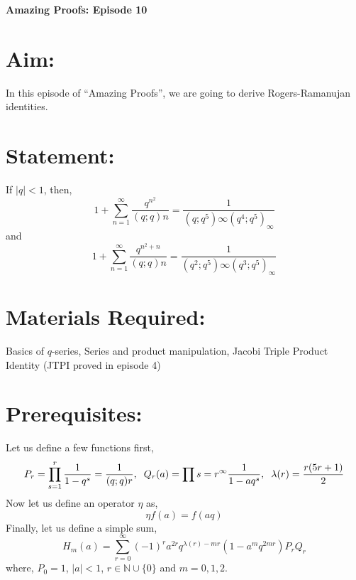 \documentclass[12pt]{article}
\begin{document}
\begin{center}\Large \bf{Amazing Proofs: Episode 10 }\end{center}

\section*{Aim:}
In this episode of \enquote{Amazing Proofs}, we are going to derive Rogers-Ramanujan identities.

\section*{Statement:}
If $|q|<1$, then,
$$1+\sum_{n=1}^{\infty}\frac{q^{n^2}}{(q;q)n}=\frac{1}{(q;q^5){\infty}(q^4;q^5)_{\infty}}$$
and 
$$1+\sum_{n=1}^{\infty}\frac{q^{n^2+n}}{(q;q)n}=\frac{1}{(q^2;q^5){\infty}(q^3;q^5)_{\infty}}$$

\section*{Materials Required:}
Basics of $q$-series, Series and product manipulation, Jacobi Triple Product Identity (JTPI proved in episode 4)

\section*{Prerequisites:}
Let us define a few functions first,
$$P_r=\prod_{s=1}^{r}\frac{1}{1-q^s}=\frac{1}{(q;q)r},\hspace{.2 cm} Q_r(a)=\prod{s=r}^{\infty}\frac{1}{1-aq^s},\hspace{.2 cm} \lambda(r)=\frac{r(5r+1)}{2}$$
Now let us define an operator $\eta$ as,
$$\eta f(a)=f(aq)$$
Finally, let us define a simple sum,
$$H_m(a)=\sum_{r=0}^{\infty}(-1)^ra^{2r}q^{\lambda(r)-mr}(1-a^mq^{2mr})P_rQ_r$$
where, $P_0=1$, $|a|<1$, $r\in\mathbb{N}\cup\{0\}$ and $m=0,1,2$.
\end{document}
